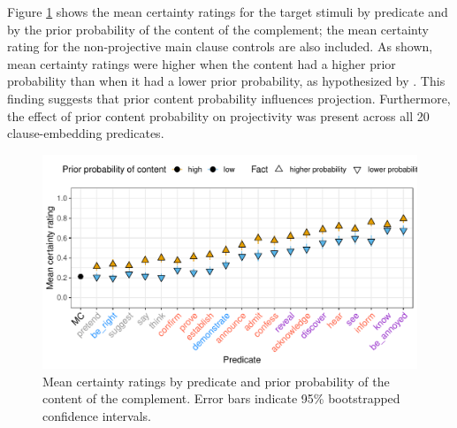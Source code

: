 \documentclass[11pt,fleqn]{article}
\newcommand{\6}{\mbox{$[\hspace*{-.6mm}[$}}
\newcommand{\9}{\mbox{$]\hspace*{-.6mm}]$}}
\begin{document}
Figure \ref{f-projection} shows the mean certainty ratings for the target stimuli by predicate and by the prior probability of the content of the complement; the mean certainty rating for the non-projective main clause controls are also included. As shown, mean certainty ratings were higher when the content had a higher prior probability than when it had a lower prior probability, as hypothesized by \citet{tbd-variability}. This finding suggests that prior content probability influences projection. Furthermore, the effect of prior content probability on projectivity was present across all 20 clause-embedding predicates.

\begin{figure}[H]
\centering

\includegraphics[width=.75\paperwidth]{../../results/exp4/graphs/means-projectivity-by-predicate-and-prior}

\caption{Mean certainty ratings by predicate and prior probability of the content of the complement. Error bars indicate 95\% bootstrapped confidence intervals.} 
\label{f-projection}
\end{figure}
\end{document}
